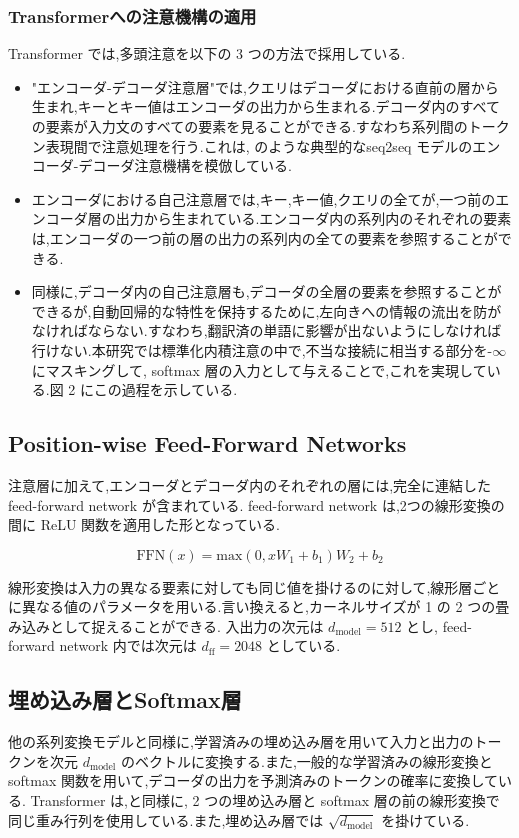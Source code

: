 \documentclass{jarticle}     %
\begin{document}
\subsubsection{Transformerへの注意機構の適用}
Transformer では,多頭注意を以下の 3 つの方法で採用している.
\begin{itemize}
  \item "エンコーダ-デコーダ注意層"では,クエリはデコーダにおける直前の層から生まれ,キーとキー値はエンコーダの出力から生まれる.デコーダ内のすべての要素が入力文のすべての要素を見ることができる.すなわち系列間のトークン表現間で注意処理を行う.これは, \cite{31,2,8}のような典型的なseq2seq モデルのエンコーダ-デコーダ注意機構を模倣している.
  \item エンコーダにおける自己注意層では,キー,キー値,クエリの全てが,一つ前のエンコーダ層の出力から生まれている.エンコーダ内の系列内のそれぞれの要素は,エンコーダの一つ前の層の出力の系列内の全ての要素を参照することができる.
  \item 同様に,デコーダ内の自己注意層も,デコーダの全層の要素を参照することができるが,自動回帰的な特性を保持するために,左向きへの情報の流出を防がなければならない.すなわち,翻訳済の単語に影響が出ないようにしなければ行けない.本研究では標準化内積注意の中で,不当な接続に相当する部分を-$\infty$にマスキングして, softmax 層の入力として与えることで,これを実現している.図 2 にこの過程を示している.
\end{itemize}

\subsection{Position-wise Feed-Forward Networks}
注意層に加えて,エンコーダとデコーダ内のそれぞれの層には,完全に連結した feed-forward network が含まれている. feed-forward network は,2つの線形変換の間に ReLU 関数を適用した形となっている.

\begin{equation}
  \mathrm{FFN}(x) = \mathrm{max}(0,xW_\mathrm{1}+b_\mathrm{1})W_\mathrm{2} + b_\mathrm{2}
\end{equation}

線形変換は入力の異なる要素に対しても同じ値を掛けるのに対して,線形層ごとに異なる値のパラメータを用いる.言い換えると,カーネルサイズが 1 の 2 つの畳み込みとして捉えることができる.
入出力の次元は $d_\mathrm{model} = 512$ とし, feed-forward network 内では次元は $d_\mathrm{ff} = 2048$ としている.

\subsection{埋め込み層とSoftmax層}
他の系列変換モデルと同様に,学習済みの埋め込み層を用いて入力と出力のトークンを次元 $d_\mathrm{model}$ のベクトルに変換する.また,一般的な学習済みの線形変換と softmax 関数を用いて,デコーダの出力を予測済みのトークンの確率に変換している. Transformer は,\cite{24}と同様に, 2 つの埋め込み層と softmax 層の前の線形変換で同じ重み行列を使用している.また,埋め込み層では $\sqrt{d_\mathrm{model}}$ を掛けている.
\end{document}
